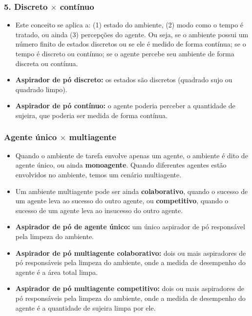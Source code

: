 \subsubsection{5. Discreto $\times$ contínuo}

\begin{itemize}
	\item Este conceito se aplica a: (1) estado do ambiente, (2) modo como o tempo é tratado, ou ainda (3) percepções do agente. Ou seja, se o ambiente possui um número finito de estados discretos ou se ele é medido de forma contínua; se o tempo é discreto ou contínuo; se o agente percebe seu ambiente de forma discreta ou contínua.
	
	\item \textbf{Aspirador de pó discreto:} os estados são discretos (quadrado sujo ou quadrado limpo).
	\item \textbf{Aspirador de pó contínuo:} o agente poderia perceber a quantidade de sujeira, que poderia ser medida de forma contínua.
\end{itemize}

\subsubsection{Agente único $\times$ multiagente}

\begin{itemize}
	\item Quando o ambiente de tarefa envolve apenas um agente, o ambiente é dito de agente único, ou ainda \textbf{monoagente}. Quando diferentes agentes estão envolvidos no ambiente, temos um cenário multiagente.
	
	\item Um ambiente multiagente pode ser ainda \textbf{colaborativo}, quando o sucesso de um agente leva ao sucesso do outro agente, ou \textbf{competitivo}, quando o sucesso de um agente leva ao insucesso do outro agente.
	
	\item \textbf{Aspirador de pó de agente único:} um único aspirador de pó responsável pela limpeza do ambiente.
	\item \textbf{Aspirador de pó multiagente colaborativo:} dois ou mais aspiradores de pó responsáveis pela limpeza do ambiente, onde a medida de desempenho do agente é a área total limpa.
	\item \textbf{Aspirador de pó multiagente competitivo:} dois ou mais aspiradores de pó responsáveis pela limpeza do ambiente, onde a medida de desempenho do agente é a quantidade de sujeira limpa por ele.
\end{itemize}

